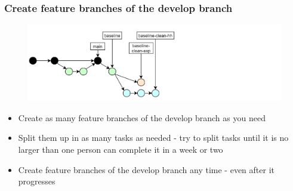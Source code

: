 \documentclass[aspectratio=169]{beamer} %
\begin{document}
\begin{frame}
	\frametitle{Create feature branches of the develop branch}
	
	\vspace{-.5cm}
	\begin{minipage}[t][5cm][t]{\textwidth}
		\begin{figure}
			\centering
			\includegraphics[width=\textwidth]{./img/dime-gitflow-network-2-2.png}
		\end{figure}
	\end{minipage}  
	
	\vspace{-.5cm}
	\begin{minipage}[t][5cm][t]{\textwidth}
		\begin{itemize}
			\setlength\itemsep{.5em}
			\item Create as many feature branches of the develop branch as you need
			\item Split them up in as many tasks as needed - try to split tasks until it is no larger than one person can complete it in a week or two
			\item Create feature branches of the develop branch any time - even after it progresses
		\end{itemize}
	\end{minipage}  
\end{frame}
\end{document}
